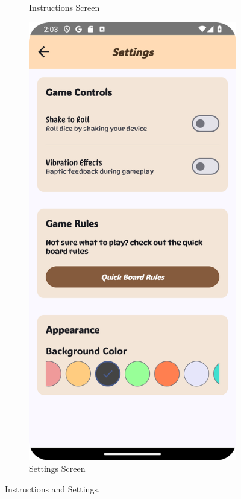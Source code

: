 \begin{figure}[ht!]
\begin{subfigure}[b]{0.27\textwidth}
        \caption{Instructions Screen}
        \label{fig:instructions_screen}
    \end{subfigure}
    \hspace{.5em}
    \begin{subfigure}[b]{0.27\textwidth}
        \centering
        \includegraphics[width=\textwidth]{img/settings screen.png}
        \caption{Settings Screen}
        \label{fig:settings_screen}
    \end{subfigure}
    \caption{Instructions and Settings.}
\end{figure}

